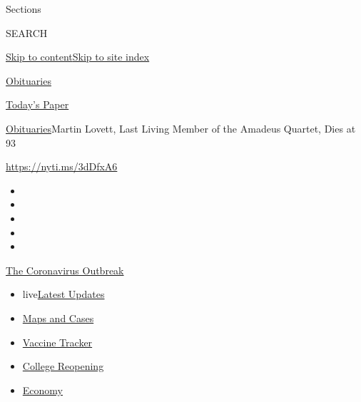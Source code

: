 Sections

SEARCH

\protect\hyperlink{site-content}{Skip to
content}\protect\hyperlink{site-index}{Skip to site index}

\href{https://www.nytimes.com/section/obituaries}{Obituaries}

\href{https://myaccount.nytimes.com/auth/login?response_type=cookie\&client_id=vi}{}

\href{https://www.nytimes.com/section/todayspaper}{Today's Paper}

\href{/section/obituaries}{Obituaries}\textbar{}Martin Lovett, Last
Living Member of the Amadeus Quartet, Dies at 93

\url{https://nyti.ms/3dDfxA6}

\begin{itemize}
\item
\item
\item
\item
\item
\end{itemize}

\href{https://www.nytimes.com/news-event/coronavirus?action=click\&pgtype=Article\&state=default\&region=TOP_BANNER\&context=storylines_menu}{The
Coronavirus Outbreak}

\begin{itemize}
\tightlist
\item
  live\href{https://www.nytimes.com/2020/08/03/world/coronavirus-covid-19.html?action=click\&pgtype=Article\&state=default\&region=TOP_BANNER\&context=storylines_menu}{Latest
  Updates}
\item
  \href{https://www.nytimes.com/interactive/2020/us/coronavirus-us-cases.html?action=click\&pgtype=Article\&state=default\&region=TOP_BANNER\&context=storylines_menu}{Maps
  and Cases}
\item
  \href{https://www.nytimes.com/interactive/2020/science/coronavirus-vaccine-tracker.html?action=click\&pgtype=Article\&state=default\&region=TOP_BANNER\&context=storylines_menu}{Vaccine
  Tracker}
\item
  \href{https://www.nytimes.com/2020/08/02/us/covid-college-reopening.html?action=click\&pgtype=Article\&state=default\&region=TOP_BANNER\&context=storylines_menu}{College
  Reopening}
\item
  \href{https://www.nytimes.com/live/2020/08/03/business/stock-market-today-coronavirus?action=click\&pgtype=Article\&state=default\&region=TOP_BANNER\&context=storylines_menu}{Economy}
\end{itemize}

